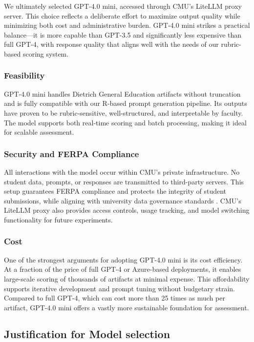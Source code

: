 \documentclass[12pt]{article}%
\begin{document}
We ultimately selected GPT-4.0 mini, accessed through CMU’s LiteLLM proxy server. This choice reflects a deliberate effort to maximize output quality while minimizing both cost and administrative burden. GPT-4.0 mini strikes a practical balance—it is more capable than GPT-3.5 and significantly less expensive than full GPT-4, with response quality that aligns well with the needs of our rubric-based scoring system.

\subsubsection*{Feasibility}

GPT-4.0 mini handles Dietrich General Education artifacts without truncation and is fully compatible with our R-based prompt generation pipeline. Its outputs have proven to be rubric-sensitive, well-structured, and interpretable by faculty. The model supports both real-time scoring and batch processing, making it ideal for scalable assessment.

\subsubsection*{Security and FERPA Compliance}

All interactions with the model occur within CMU’s private infrastructure. No student data, prompts, or responses are transmitted to third-party servers. This setup guarantees FERPA compliance and protects the integrity of student submissions, while aligning with university data governance standards \cite{FERPA}. CMU’s LiteLLM proxy also provides access controls, usage tracking, and model switching functionality for future experiments.

\subsubsection*{Cost}

One of the strongest arguments for adopting GPT-4.0 mini is its cost efficiency. At a fraction of the price of full GPT-4 or Azure-based deployments, it enables large-scale scoring of thousands of artifacts at minimal expense. This affordability supports iterative development and prompt tuning without budgetary strain. Compared to full GPT-4, which can cost more than 25 times as much per artifact, GPT-4.0 mini offers a vastly more sustainable foundation for assessment.

\subsection*{Justification for Model selection}
\end{document}
